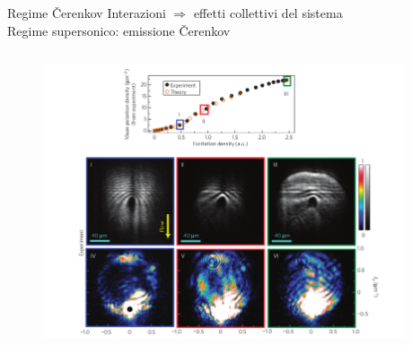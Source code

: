 \begin{frame}{Regime \v{C}erenkov}
  Interazioni $\Rightarrow$ effetti collettivi del sistema\\
      Regime supersonico: emissione \v{C}erenkov\\
  \begin{columns}[t]
  
    \begin{column}{.7\textwidth}
     \begin{figure}
  \centering
    \includegraphics[width=\columnwidth]{pics/scattering-cher-all.png}
  \end{figure}
  \hspace{-10pt}
    \end{column}
    \begin{column}{.3\textwidth}
    

\end{column}
\end{columns}
\end{frame}
